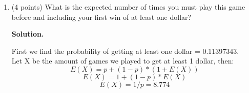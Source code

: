 \documentclass[10pt,letterpaper,unboxed,cm]{article}
\newenvironment{solution}
  {\par\noindent\textbf{Solution.}\ }
  {\par}
\begin{document}
\begin{enumerate}
\begin{enumerate}
\begin{solution}
\end{solution}

\item (4 points)
What is the expected number of times you must play this game before and including your first win of at least one dollar?

\begin{solution}
    
    First we find the probability of getting at least one dollar = 0.11397343. \\
    Let X be the amount of games we played to get at least 1 dollar, then:
    \[E(X) = p + (1 - p) * (1 + E(X))\]
    \[E(X) = 1 + (1 - p) * E(X)\]
    \[E(X) = 1/p = \boxed{8.774}\]

\end{solution}

\end{enumerate}



\end{enumerate}
\end{document}

